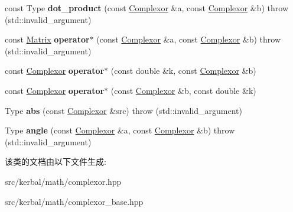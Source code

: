 \begin{DoxyCompactItemize}
\item 
\mbox{\label{classkerbal_1_1math_1_1_complexor_aa3812622d5a79ddef0c8e0517a23fed8}} 
const Type {\bfseries dot\+\_\+product} (const \hyperlink{classkerbal_1_1math_1_1_complexor}{Complexor} \&a, const \hyperlink{classkerbal_1_1math_1_1_complexor}{Complexor} \&b)  throw (std\+::invalid\+\_\+argument)
\item 
\mbox{\label{classkerbal_1_1math_1_1_complexor_acc83bb1a38d6bd9732d5998fa52f82ac}} 
const \hyperlink{classkerbal_1_1math_1_1_matrix}{Matrix} {\bfseries operator$\ast$} (const \hyperlink{classkerbal_1_1math_1_1_complexor}{Complexor} \&a, const \hyperlink{classkerbal_1_1math_1_1_complexor}{Complexor} \&b)  throw (std\+::invalid\+\_\+argument)
\item 
\mbox{\label{classkerbal_1_1math_1_1_complexor_afdaef4546af79a4422af6412c0ee900b}} 
const \hyperlink{classkerbal_1_1math_1_1_complexor}{Complexor} {\bfseries operator$\ast$} (const double \&k, const \hyperlink{classkerbal_1_1math_1_1_complexor}{Complexor} \&b)
\item 
\mbox{\label{classkerbal_1_1math_1_1_complexor_adfe11c960c527a7435e109992de9a531}} 
const \hyperlink{classkerbal_1_1math_1_1_complexor}{Complexor} {\bfseries operator$\ast$} (const \hyperlink{classkerbal_1_1math_1_1_complexor}{Complexor} \&b, const double \&k)
\item 
\mbox{\label{classkerbal_1_1math_1_1_complexor_a74dabd94c38e6f51333fca12dca5b61b}} 
Type {\bfseries abs} (const \hyperlink{classkerbal_1_1math_1_1_complexor}{Complexor} \&src)  throw (std\+::invalid\+\_\+argument)
\item 
\mbox{\label{classkerbal_1_1math_1_1_complexor_a7a25fb2bd7d0ddaacce171a471392fee}} 
Type {\bfseries angle} (const \hyperlink{classkerbal_1_1math_1_1_complexor}{Complexor} \&a, const \hyperlink{classkerbal_1_1math_1_1_complexor}{Complexor} \&b)  throw (std\+::invalid\+\_\+argument)
\end{DoxyCompactItemize}


该类的文档由以下文件生成\+:\begin{DoxyCompactItemize}
\item 
src/kerbal/math/complexor.\+hpp\item 
src/kerbal/math/complexor\+\_\+base.\+hpp\end{DoxyCompactItemize}
